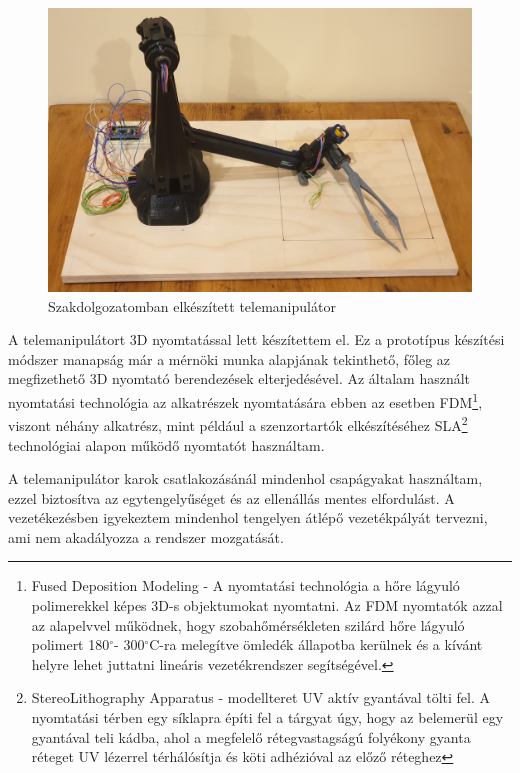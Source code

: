 \begin{figure}[!ht]
\centering
\includegraphics[width=120mm, keepaspectratio]{figures/Szakdoga/0_v_4_csipeszes}
\caption{Szakdolgozatomban elkészített telemanipulátor\cite{szakdoga}}
\label{fig:Szakdoga_telemanip_csipeszes}
\end{figure}

A telemanipulátort 3D nyomtatással lett készítettem el. Ez a prototípus készítési módszer manapság már a mérnöki munka alapjának tekinthető, főleg az megfizethető 3D nyomtató berendezések elterjedésével. Az általam használt nyomtatási technológia az alkatrészek nyomtatására ebben az esetben FDM\footnote{Fused Deposition Modeling - A nyomtatási technológia a hőre lágyuló polimerekkel képes 3D-s objektumokat nyomtatni. Az FDM nyomtatók azzal az alapelvvel működnek, hogy szobahőmérsékleten szilárd hőre lágyuló polimert 180$^{\circ}$- 300$^{\circ}$C-ra melegítve ömledék állapotba kerülnek és a kívánt helyre lehet juttatni lineáris vezetékrendszer segítségével.\cite{noorani20173d}}, viszont néhány alkatrész, mint például a szenzortartók elkészítéséhez SLA\footnote{StereoLithography Apparatus - modellteret UV aktív gyantával tölti fel. A nyomtatási térben egy síklapra építi fel a tárgyat úgy, hogy az belemerül egy gyantával teli kádba, ahol a megfelelő rétegvastagságú folyékony gyanta réteget UV lézerrel térhálósítja és köti adhézióval az előző réteghez\cite{noorani20173d}} technológiai alapon működő nyomtatót használtam. \cite{szakdoga}

A telemanipulátor karok csatlakozásánál mindenhol csapágyakat használtam, ezzel biztosítva az egytengelyűséget és az ellenállás mentes elfordulást. A vezetékezésben igyekeztem mindenhol tengelyen átlépő vezetékpályát tervezni, ami nem akadályozza a rendszer mozgatását.\cite{szakdoga}

